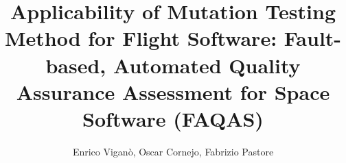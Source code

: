\documentclass[acmsmall,nonacm]{acmart}
\begin{document}
\title[]{Applicability of Mutation Testing Method for Flight Software: Fault-based, Automated Quality Assurance Assessment for Space Software (FAQAS)}


\author{Enrico Viganò, Oscar Cornejo, Fabrizio Pastore}

%
%
%


\renewcommand{\shortauthors}{}
\end{document}
